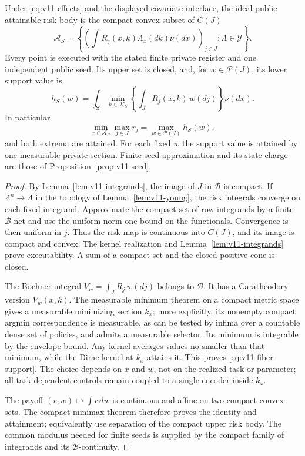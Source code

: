 \begin{theorem}
\label{thm:v11-conditional}
Under \eqref{eq:v11-effects} and the displayed-covariate interface, the
ideal-public attainable risk body is the compact convex subset of $C(J)$
\[
 \mathcal A_S=
 \left\{\left(\int R_j(x,k)\Lambda_x(dk)\nu(dx)\right)_{j\in J}:
                  \Lambda\in\mathcal Y\right\}.
\]
Every point is executed with the stated finite private register and one
independent public seed. Its upper set is closed, and, for
$w\in\mathcal P(J)$, its lower support value is
\begin{equation}
 h_S(w)=\int_{\mathsf X}\min_{k\in\mathcal K_S}
          \left\{\int_JR_j(x,k)\,w(dj)\right\}\nu(dx).
 \label{eq:v11-fiber-support}
\end{equation}
In particular
\[
 \min_{r\in\mathcal A_S}\max_{j\in J}r_j
       =\max_{w\in\mathcal P(J)}h_S(w),
\]
and both extrema are attained. For each fixed $w$ the support value is
attained by one measurable private section. Finite-seed approximation and
its state charge are those of Proposition~\ref{prop:v11-seed}.
\end{theorem}

\begin{proof}
By Lemma~\ref{lem:v11-integrands}, the image of $J$ in $\mathcal B$ is
compact. If $\Lambda^n\to\Lambda$ in the topology of
Lemma~\ref{lem:v11-young}, the risk integrals converge on each fixed
integrand. Approximate the compact set of row integrands by a finite
$\mathcal B$-net and use the uniform norm-one bound on the functionals.
Convergence is then uniform in $j$. Thus the risk map is continuous into
$C(J)$, and its image is compact and convex. The kernel realization and
Lemma~\ref{lem:v11-integrands} prove executability. A sum of a compact set
and the closed positive cone is closed.

The Bochner integral $V_w=\int_JR_j\,w(dj)$ belongs to $\mathcal B$.
It has a Caratheodory version $V_w(x,k)$. The measurable minimum theorem
on a compact metric space gives a measurable minimizing section $k_x$;
more explicitly, its nonempty compact argmin correspondence is measurable,
as can be tested by infima over a countable dense set of policies, and
admits a measurable selector. Its minimum is integrable by the envelope
bound. Any kernel averages values no smaller than that minimum, while
the Dirac kernel at $k_x$ attains it. This proves
\eqref{eq:v11-fiber-support}. The choice depends on $x$ and $w$, not on
the realized task or parameter; all task-dependent controls remain
coupled to a single encoder inside $k_x$.

The payoff $(r,w)\mapsto\int r\,dw$ is continuous and affine on two
compact convex sets. The compact minimax theorem therefore proves the
identity and attainment; equivalently use separation of the compact
upper risk body. The common modulus needed for finite seeds is supplied
by the compact family of integrands and its $\mathcal B$-continuity.
\end{proof}

